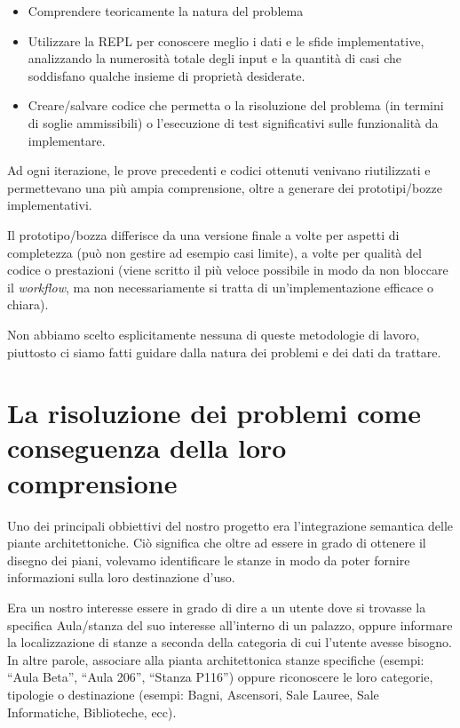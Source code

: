 \documentclass[12pt]{report}
\begin{document}
\begin{itemize}
	\item Comprendere teoricamente la natura del problema
	\item Utilizzare la REPL per conoscere meglio i dati e le sfide
implementative, analizzando la numerosità totale degli input e la
quantità di casi che soddisfano qualche insieme di proprietà desiderate.
	\item Creare/salvare codice che permetta o la risoluzione del
problema (in termini di soglie ammissibili) o l'esecuzione di test
significativi sulle funzionalità da implementare.
\end{itemize}

Ad ogni iterazione, le prove precedenti e codici ottenuti venivano
riutilizzati e permettevano una più ampia comprensione, oltre a
generare dei prototipi/bozze implementativi.

Il prototipo/bozza differisce da una versione finale a volte per
aspetti di completezza (può non gestire ad esempio casi limite), a
volte per qualità del codice o prestazioni (viene scritto il più
veloce possibile in modo da non bloccare il \textit{workflow}, ma non
necessariamente si tratta di un'implementazione efficace o chiara).

Non abbiamo scelto esplicitamente nessuna di queste metodologie di
lavoro, piuttosto ci siamo fatti guidare dalla natura dei problemi e
dei dati da trattare. 

\section{La risoluzione dei problemi come conseguenza della loro comprensione}

Uno dei principali obbiettivi del nostro progetto era l'integrazione
semantica delle piante architettoniche. Ciò significa che oltre ad
essere in grado di ottenere il disegno dei piani, volevamo
identificare le stanze in modo da poter fornire informazioni sulla loro
destinazione d'uso. 

Era un nostro interesse essere in grado di dire a un utente
dove si trovasse la specifica Aula/stanza del suo interesse all'interno
di un palazzo, oppure informare la localizzazione di stanze a seconda
della categoria di cui l'utente avesse bisogno. In altre parole, 
associare alla pianta architettonica
stanze specifiche (esempi: ``Aula Beta'', ``Aula 206'', ``Stanza P116'')
oppure riconoscere le loro categorie, tipologie o 
destinazione (esempi: Bagni, Ascensori, Sale Lauree, Sale Informatiche,
Biblioteche, ecc).
\end{document}

